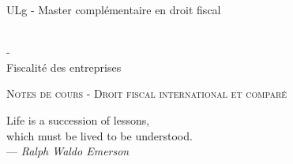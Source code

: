 \documentclass{book}
\begin{document}
\sffamily
\newcommand{\RPoint}{\protect\texttt{[image: point.png]}}
\newcommand{\RSave}{\protect\texttt{[image: Save.png]}}
\renewcommand\labelitemii{\ding{220}}
\begin{titlepage}

\begin{center}
\begin{Large}ULg - Master complémentaire en droit fiscal\end{Large}\\
\vspace{0.5cm}- \\
\vspace{0.5cm}
Fiscalité des entreprises

\end{center}
\vspace{6cm}

\LARGE
\begin{center}
\textsc{Notes de cours - Droit fiscal international et comparé}\\
\end{center}

\vspace{10.0cm}

\normalsize
{}

\end{titlepage}

\newpage

\thispagestyle{empty}
\setcounter{page}{0}
\null

\newpage
\thispagestyle{empty}
\setcounter{page}{0}
\vspace{20cm}

\vfill
\begin{flushright}
Life is a succession of lessons, \\
which must be lived to be understood. \\ 
--- \textit{Ralph Waldo Emerson}
\end{flushright}
\vfill
\newpage

\renewcommand{\chaptermark}[1]{\markboth{#1}{}}
\renewcommand{\sectionmark}[1]{\markright{\thesection\ #1}}
\fancyhf{} \fancyhead[LE,RO]{\bfseries\thepage}
\fancyhead[LO]{\bfseries\rightmark}
\fancyhead[RE]{\bfseries\leftmark}
\renewcommand{\headrulewidth}{0.5pt}
\addtolength{\headheight}{0.5pt}
\renewcommand{\footrulewidth}{0pt}
\fancypagestyle{plain}{ \fancyhead{}
\renewcommand{\headrulewidth}{0pt}}
\end{document}
